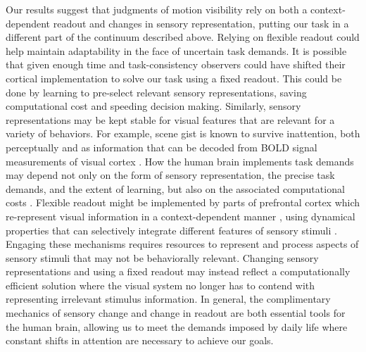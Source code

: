 Our results suggest that judgments of motion visibility rely on both a context-dependent readout and changes in sensory representation, putting our task in a different part of the continuum described above. Relying on flexible readout could help maintain adaptability in the face of uncertain task demands. It is possible that given enough time and task-consistency observers could have shifted their cortical implementation to solve our task using a fixed readout. This could be done by learning to pre-select relevant sensory representations, saving computational cost and speeding decision making. Similarly, sensory representations may be kept stable for visual features that are relevant for a variety of behaviors. For example, scene gist is known to survive inattention, both perceptually \citep{Li2002-ji} and as information that can be decoded from BOLD signal measurements of visual cortex \citep{Peelen2009-us}. 
How the human brain implements task demands may depend not only on the form of sensory representation, the precise task demands, and the extent of learning, but also on the associated computational costs \citep{Gardner2019-ky}. Flexible readout might be implemented by parts of prefrontal cortex which re-represent visual information in a context-dependent manner \citep{Bugatus2017-wl}, using dynamical properties that can selectively integrate different features of sensory stimuli \citep{Mante2013-tn}. Engaging these mechanisms requires resources to represent and process aspects of sensory stimuli that may not be behaviorally relevant. Changing sensory representations and using a fixed readout may instead reflect a computationally efficient solution where the visual system no longer has to contend with representing irrelevant stimulus information. In general, the complimentary mechanics of sensory change and change in readout are both essential tools for the human brain, allowing us to meet the demands imposed by daily life where constant shifts in attention are necessary to achieve our goals.
